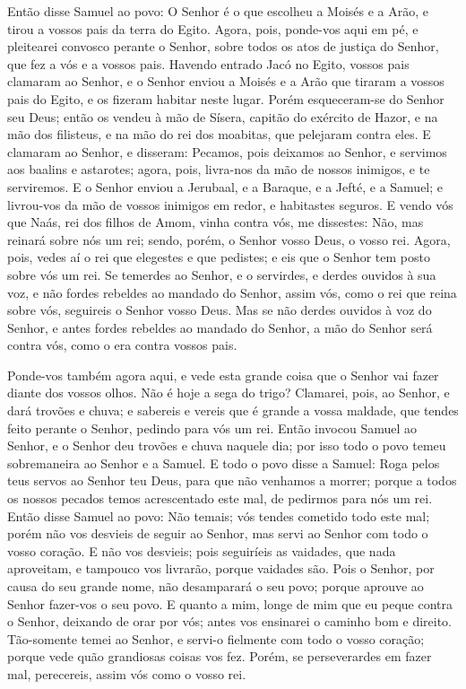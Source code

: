 Então disse Samuel ao povo: O Senhor é o que escolheu a Moisés e a
Arão, e tirou a vossos pais da terra do Egito. Agora, pois,
ponde-vos aqui em pé, e pleitearei convosco perante o Senhor, sobre
todos os atos de justiça do Senhor, que fez a vós e a vossos pais.
Havendo entrado Jacó no Egito, vossos pais clamaram ao Senhor, e
o Senhor enviou a Moisés e a Arão que tiraram a vossos pais do
Egito, e os fizeram habitar neste lugar. Porém esqueceram-se do
Senhor seu Deus; então os vendeu à mão de Sísera, capitão do
exército de Hazor, e na mão dos filisteus, e na mão do rei dos
moabitas, que pelejaram contra eles. E clamaram ao Senhor, e
disseram: Pecamos, pois deixamos ao Senhor, e servimos aos baalins e
astarotes; agora, pois, livra-nos da mão de nossos inimigos, e te
serviremos. E o Senhor enviou a Jerubaal, e a Baraque, e a
Jefté, e a Samuel; e livrou-vos da mão de vossos inimigos em redor,
e habitastes seguros. E vendo vós que Naás, rei dos filhos de
Amom, vinha contra vós, me dissestes: Não, mas reinará sobre nós um
rei; sendo, porém, o Senhor vosso Deus, o vosso rei. Agora,
pois, vedes aí o rei que elegestes e que pedistes; e eis que o
Senhor tem posto sobre vós um rei. Se temerdes ao Senhor, e o
servirdes, e derdes ouvidos à sua voz, e não fordes rebeldes ao
mandado do Senhor, assim vós, como o rei que reina sobre vós,
seguireis o Senhor vosso Deus. Mas se não derdes ouvidos à
voz do Senhor, e antes fordes rebeldes ao mandado do Senhor, a mão
do Senhor será contra vós, como o era contra vossos pais.

Ponde-vos também agora aqui, e vede esta grande coisa que o
Senhor vai fazer diante dos vossos olhos. Não é hoje a sega
do trigo? Clamarei, pois, ao Senhor, e dará trovões e chuva; e
sabereis e vereis que é grande a vossa maldade, que tendes feito
perante o Senhor, pedindo para vós um rei. Então invocou
Samuel ao Senhor, e o Senhor deu trovões e chuva naquele dia; por
isso todo o povo temeu sobremaneira ao Senhor e a Samuel. E
todo o povo disse a Samuel: Roga pelos teus servos ao Senhor teu
Deus, para que não venhamos a morrer; porque a todos os nossos
pecados temos acrescentado este mal, de pedirmos para nós um rei.
Então disse Samuel ao povo: Não temais; vós tendes cometido
todo este mal; porém não vos desvieis de seguir ao Senhor, mas servi
ao Senhor com todo o vosso coração. E não vos desvieis; pois
seguiríeis as vaidades, que nada aproveitam, e tampouco vos
livrarão, porque vaidades são. Pois o Senhor, por causa do
seu grande nome, não desamparará o seu povo; porque aprouve ao
Senhor fazer-vos o seu povo. E quanto a mim, longe de mim que
eu peque contra o Senhor, deixando de orar por vós; antes vos
ensinarei o caminho bom e direito. Tão-somente temei ao
Senhor, e servi-o fielmente com todo o vosso coração; porque vede
quão grandiosas coisas vos fez. Porém, se perseverardes em
fazer mal, perecereis, assim vós como o vosso rei.

